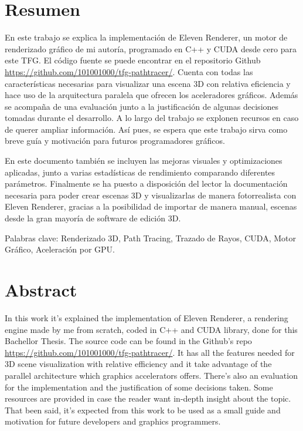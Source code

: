 \chapter*{Resumen}

En este trabajo se explica la implementación de Eleven Renderer, un motor de renderizado gráfico de mi autoría, programado en C++ y CUDA desde cero para este TFG. El código fuente se puede encontrar en el repositorio Github \url{https://github.com/101001000/tfg-pathtracer/}. Cuenta con todas las características necesarias para visualizar una escena 3D con relativa eficiencia y hace uso de la arquitectura paralela que ofrecen los aceleradores gráficos. Además se acompaña de una evaluación junto a la justificación de algunas decisiones tomadas durante el desarrollo. A lo largo del trabajo se explonen recursos en caso de querer ampliar información. Así pues, se espera que este trabajo sirva como breve guía y motivación para futuros programadores gráficos.

En este documento también se incluyen las mejoras visuales y optimizaciones aplicadas, junto a varias estadísticas de rendimiento comparando diferentes parámetros. Finalmente se ha puesto a disposición del lector la documentación necesaria para poder crear escenas 3D y visualizarlas de manera fotorrealista con Eleven Renderer, gracias a la posibilidad de importar de manera manual, escenas desde la gran mayoría de software de edición 3D. 

Palabras clave: Renderizado 3D, Path Tracing, Trazado de Rayos, CUDA, Motor Gráfico, Aceleración por GPU.

\chapter*{Abstract}

In this work it's explained the implementation of Eleven Renderer, a rendering engine made by me from scratch, coded in C++ and CUDA library, done for this Bachellor Thesis. The source code can be found in the Github's repo \url{https://github.com/101001000/tfg-pathtracer/}. It has all the features needed for 3D scene visualization with relative efficiency and it take advantage of the parallel architecture which graphics accelerators offers. There's also an evaluation for the implementation and the justification of some decisions taken. Some resources are provided in case the reader want in-depth insight about the topic. That been said, it's expected from this work to be used as a small guide and motivation for future developers and graphics programmers.

